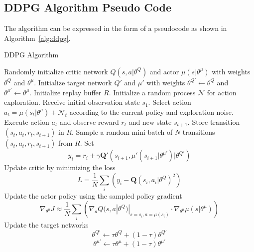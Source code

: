 \subsection{DDPG Algorithm Pseudo Code}
The algorithm can be expressed in the form of a pseudocode as shown in Algorithm~\ref{alg:ddpg}.
\begin{algorithm}
    \caption{DDPG Algorithm}
    \label{alg:ddpg}
    \begin{algorithmic}
        \State Randomly initialize critic network $Q(s,a|\theta^Q)$ and actor $\mu(s|\theta^{\mu})$ with weights $\theta^Q$ and $\theta^{\mu}$.
        \State Initialize target network $Q'$ and $\mu'$ with weights $\theta^{Q'} \gets \theta^Q$ and $\theta^{\mu'} \gets \theta^{\mu}$.
        \State Initialize replay buffer $R$.
            \State Initialize a random process $\mathcal{N}$ for action exploration.
            \State Receive initial observation state $s_1$.
                \State Select action $a_t = \mu\left( s_t | \theta^{\mu} \right) + \mathcal{N}_t$ according to the current policy and exploration noise.
                \State Execute action $a_t$ and observe reward $r_t$ and new state $s_{t+1}$.
                \State Store transition $(s_t, a_t, r_t, s_{t+1})$ in $R$.
                \State Sample a random mini-batch of $N$ transitions $(s_t, a_t, r_t, s_{t+1})$ from $R$.
                \State Set
                \[ y_i = r_i + \gamma \mathbf{Q}' \left( s_{i+1}, \mu'\left( s_{i+1} | \theta^{\mu'} \right) | \theta^{Q'} \right) \]
                \State Update critic by minimizing the loss
                \[ L = \frac{1}{N} \sum_{i}\left( y_i - \mathbf{Q}\left( s_i, a_i | \theta^Q \right)^2 \right) \]
                \State Update the actor policy using the sampled policy gradient
                \[ \nabla_{\theta^\mu} J \approx \frac{1}{N} \sum_{i}\left( \nabla_a Q(s,a|\theta^Q)|_{s=s_i, a= \mu(s_i)} \cdot \nabla_{\theta^{\mu}} \mu \left( s | \theta^{\mu} \right) \right) \]
                \State Update the target networks
                \[ \theta^{Q'} \gets \tau \theta^Q + (1- \tau) \theta^{Q'} \]
                \[ \theta^{\mu'} \gets \tau \theta^\mu + (1- \tau) \theta^{\mu'} \]
            \EndFor
        \EndFor 
    \end{algorithmic}
\end{algorithm}